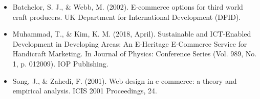 \begin{itemize}
\item Batchelor, S. J., \& Webb, M. (2002). E-commerce options for third world craft producers. UK Department for International Development (DFID).

\item Muhammad, T., \& Kim, K. M. (2018, April). Sustainable and ICT-Enabled Development in Developing Areas: An E-Heritage E-Commerce Service for Handicraft Marketing. In Journal of Physics: Conference Series (Vol. 989, No. 1, p. 012009). IOP Publishing.

\item Song, J., \& Zahedi, F. (2001). Web design in e-commerce: a theory and empirical analysis. ICIS 2001 Proceedings, 24.


\end{itemize}
